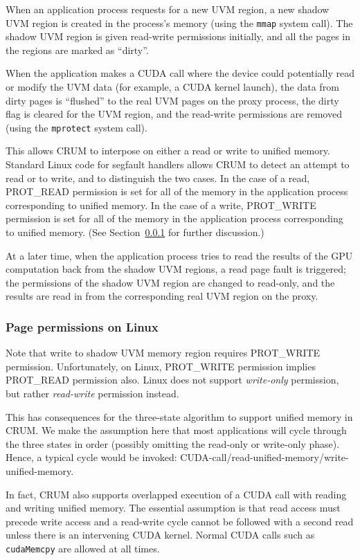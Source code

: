 \documentclass[11pt]{article}
\begin{document}
When an application process requests for a new UVM region, a new
shadow UVM region is created in the process's memory (using the
\texttt{mmap} system call). The shadow UVM region is given read-write
permissions initially, and all the pages in the regions are marked
as ``dirty''.

When the application makes a CUDA call where the device could
potentially read or modify the UVM data (for example, a CUDA kernel
launch), the data from dirty pages is ``flushed'' to the real UVM
pages on the proxy process, the dirty flag is cleared for the UVM
region, and the read-write permissions are removed (using the
\texttt{mprotect} system call).

This allows CRUM to interpose on either a read or write to unified
memory. Standard Linux code for segfault handlers allows CRUM to
detect an attempt to read or to write, and to distinguish the two
cases. In the case of a read, PROT\_READ permission is set for all
of the memory in the application process corresponding to unified memory.
In the case of a write, PROT\_WRITE permission is set
for all of the memory in the application process corresponding to unified
memory. (See Section~\ref{sec:linuxPagePerms} for further discussion.)

At a later time, when the application process tries to read the
results of the GPU computation back from the shadow UVM regions, a
read page fault is triggered; the permissions of the shadow UVM region
are changed to read-only, and the results are read in from the
corresponding real UVM region on the proxy.

\subsubsection{Page permissions on Linux}
\label{sec:linuxPagePerms}

Note that write to shadow UVM memory region requires PROT\_WRITE permission.
Unfortunately, on Linux, PROT\_WRITE permission implies PROT\_READ
permission also.  Linux does not support {\em write-only} permission,
but rather {\em read-write} permission instead.

This has consequences for the three-state algorithm to support
unified memory in CRUM.  We make the assumption here that most
applications will cycle through the three states in order (possibly
omitting the read-only or write-only phase).  Hence, a typical cycle
would be invoked: CUDA-call/read-unified-memory/write-unified-memory.

In fact, CRUM also supports overlapped execution of a CUDA call
with reading and writing unified memory.  The essential assumption
is that read access must precede write access and a read-write cycle
cannot be followed with a second read unless there is an intervening
CUDA kernel.  Normal CUDA calls such as \texttt{cudaMemcpy} are allowed at
all times.
\end{document}
